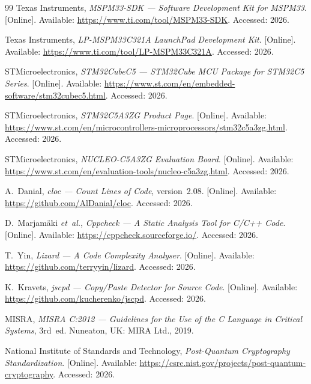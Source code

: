 \documentclass[12pt,a4paper,oneside]{book}
\begin{document}
\begin{thebibliography}{99}
Texas Instruments, \emph{MSPM33-SDK --- Software Development Kit for MSPM33}. [Online]. Available: \url{https://www.ti.com/tool/MSPM33-SDK}. Accessed: 2026.

Texas Instruments, \emph{LP-MSPM33C321A LaunchPad Development Kit}. [Online]. Available: \url{https://www.ti.com/tool/LP-MSPM33C321A}. Accessed: 2026.

STMicroelectronics, \emph{STM32CubeC5 --- STM32Cube MCU Package for STM32C5 Series}. [Online]. Available: \url{https://www.st.com/en/embedded-software/stm32cubec5.html}. Accessed: 2026.

STMicroelectronics, \emph{STM32C5A3ZG Product Page}. [Online]. Available: \url{https://www.st.com/en/microcontrollers-microprocessors/stm32c5a3zg.html}. Accessed: 2026.

STMicroelectronics, \emph{NUCLEO-C5A3ZG Evaluation Board}. [Online]. Available: \url{https://www.st.com/en/evaluation-tools/nucleo-c5a3zg.html}. Accessed: 2026.

A.~Danial, \emph{cloc --- Count Lines of Code}, version~2.08. [Online]. Available: \url{https://github.com/AlDanial/cloc}. Accessed: 2026.

D.~Marjam\"{a}ki \emph{et~al.}, \emph{Cppcheck --- A Static Analysis Tool for C/C++ Code}. [Online]. Available: \url{https://cppcheck.sourceforge.io/}. Accessed: 2026.

T.~Yin, \emph{Lizard --- A Code Complexity Analyser}. [Online]. Available: \url{https://github.com/terryyin/lizard}. Accessed: 2026.

K.~Kravets, \emph{jscpd --- Copy/Paste Detector for Source Code}. [Online]. Available: \url{https://github.com/kucherenko/jscpd}. Accessed: 2026.

MISRA, \emph{MISRA C:2012 --- Guidelines for the Use of the C Language in Critical Systems}, 3rd~ed. Nuneaton, UK: MIRA Ltd., 2019.

National Institute of Standards and Technology, \emph{Post-Quantum Cryptography Standardization}. [Online]. Available: \url{https://csrc.nist.gov/projects/post-quantum-cryptography}. Accessed: 2026.

\end{thebibliography}
\end{document}
